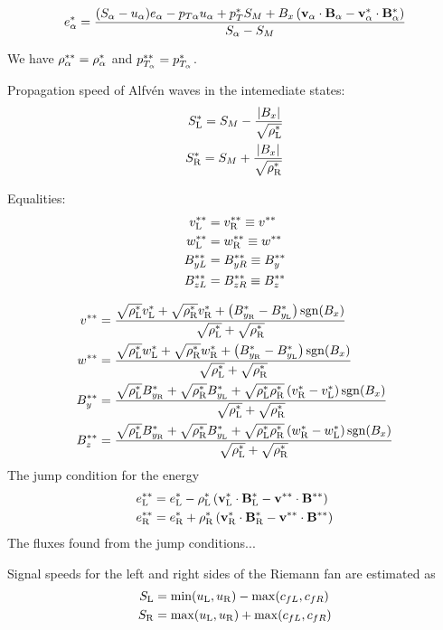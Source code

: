\documentclass[11pt]{article}
\begin{document}
\begin{equation}
\sea=\frac{(S_\alpha-u_\alpha)e_\alpha-p_{T\alpha}u_\alpha
+\spT\SM+B_x\left(
\vect{v}_\alpha\cdot\vect{B}_\alpha-
\vect{v}_\alpha^*\cdot\vect{B}_\alpha^*
\right)}{S_\alpha-\SM}
\end{equation}

We have $\ssrhoa=\srhoa$ and $\sspTa=\spTa$.

Propagation speed of Alfv\'en waves in the intemediate
states:
\begin{align}
\sSL=\SM-\frac{|B_x|}{\sqrt\srhoL}
\\
\sSR=\SM+\frac{|B_x|}{\sqrt\srhoR}
\end{align}

Equalities:
\begin{align}
\ssvL&=\ssvR\equiv\ssv\\
\sswL&=\sswR\equiv\ssw\\
\ssByL&=\ssByR\equiv\ssBy\\
\ssBzL&=\ssBzR\equiv\ssBz
\end{align}

\begin{align}
\ssv&=\frac{\sqrt\srhoL\svL+\sqrt\srhoR\svR
+\left(\sByR-\sByL\right)\sgn(B_x)}{\den}
\\
\ssw&=\frac{\sqrt\srhoL\swL+\sqrt\srhoR\swR
+\left(\sBzR-\sBzL\right)\sgn(B_x)}{\den}
\\
\ssBy&=\frac{\sqrt\srhoL\sByR+\sqrt\srhoR\sByL
+\sqrt{\srhoL\srhoR}\left(\svR-\svL\right)\sgn(B_x)}{\den}
\\
\ssBz&=\frac{\sqrt\srhoL\sBzR+\sqrt\srhoR\sBzL
+\sqrt{\srhoL\srhoR}\left(\swR-\swL\right)\sgn(B_x)}{\den}
\end{align}
The jump condition for the energy
\begin{align}
\sseL&=\seL - \srhoL\left(\vect{v}_\stateL^{*}\cdot\vect{B}_\stateL^{*}
                      -\vect{v}^{**}\cdot\vect{B}^{**}\right)
\\
\sseR&=\seR + \srhoR\left(\vect{v}_\stateR^{*}\cdot\vect{B}_\stateR^{*}
                      -\vect{v}^{**}\cdot\vect{B}^{**}\right)
\end{align}
The fluxes found from the jump conditions...

Signal speeds for the left and right sides of the Riemann fan
are estimated as
\begin{subequations}
\begin{align}
S_\stateL&=\min(u_\stateL,u_\stateR)-\max(c_{fL},c_{fR})
\\
S_\stateR&=\max(u_\stateL,u_\stateR)+\max(c_{fL},c_{fR})
\end{align}
\end{subequations}




\end{document}
